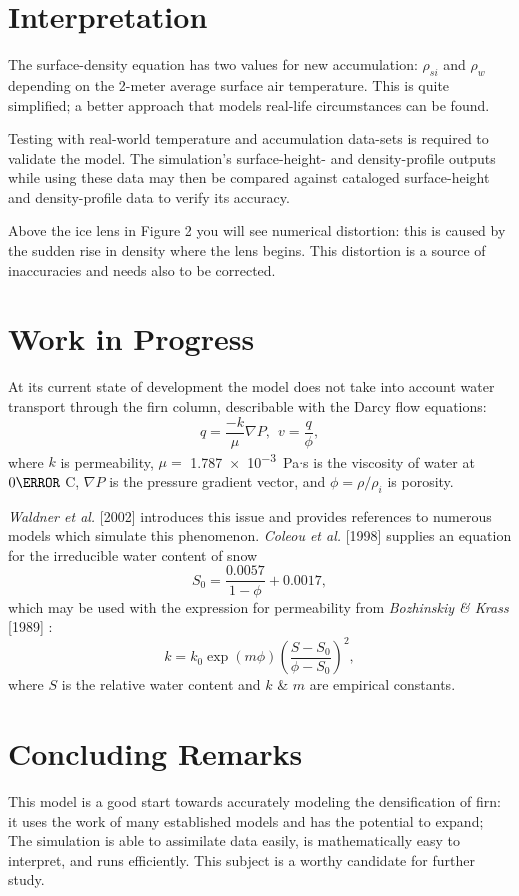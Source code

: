 \documentclass{article}%
\begin{document}
\section{Interpretation}

The surface-density equation has two values for new accumulation: $\rho_{si}$ and $\rho_w$ depending on the 2-meter average surface air temperature.  This is quite simplified; a better approach that models real-life circumstances can be found.  

Testing with real-world temperature and accumulation data-sets is required to validate the model.  The simulation's surface-height- and density-profile outputs while using these data may then be compared against cataloged surface-height and density-profile data to verify its accuracy.

Above the ice lens in Figure 2 you will see numerical distortion: this is caused by the sudden rise in density where the lens begins.  This distortion is a source of inaccuracies and needs also to be corrected.

\newpage
\section{Work in Progress}
At its current state of development the model does not take into account water transport through the firn column, describable with the Darcy flow equations:
  $$
    q = \frac{-k}{\mu}\nabla P, \ \  v = \frac{q}{\phi},
  $$
where $k$ is permeability, $\mu =$ \SI{1.787e-3} Pa$\cdot$s is the viscosity of water at $0\degree$ C, $\nabla P$ is the pressure gradient vector, and $\phi = \rho/\rho_i$ is porosity.

\emph{Waldner et al.} [2002] introduces this issue and provides references to numerous models which simulate this phenomenon.  \emph{Coleou et al.} [1998] supplies an equation for the irreducible water content of snow
  $$
    S_0 = \frac{0.0057}{1 - \phi} + 0.0017,
  $$
which may be used with the expression for permeability from \emph{Bozhinskiy \& Krass} [1989] :
  $$
    k = k_0 \exp(m \phi)\left( \frac{S - S_0}{\phi - S_0} \right)^2,
  $$
where $S$ is the relative water content and $k$ \& $m$ are empirical constants.


\section{Concluding Remarks}
This model is a good start towards accurately modeling the densification of firn: it uses the work of many established models and has the potential to expand;  The simulation is able to assimilate data easily, is mathematically easy to interpret, and runs efficiently.  This subject is a worthy candidate for further study.  
\end{document}
